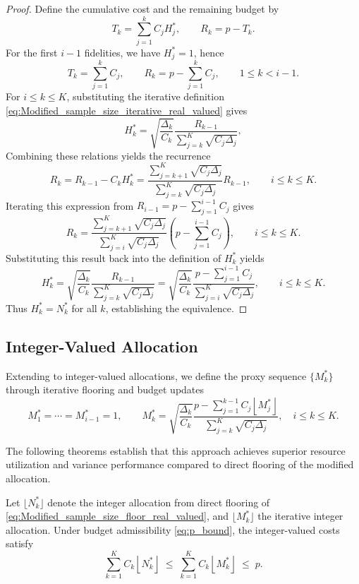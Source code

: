 \begin{proof}
Define the cumulative cost and the remaining budget by
%
\[
T_k = \sum_{j=1}^k C_j H_j^*, 
\qquad 
R_k = p - T_k.
\]
%
For the first $i-1$ fidelities, we have $H_j^* = 1$, hence
%
\[
T_k = \sum_{j=1}^k C_j, \qquad R_k = p - \sum_{j=1}^k C_j, \qquad 1 \le k < i-1.
\]
%
For $i \le k \le K$, substituting the iterative definition \eqref{eq:Modified_sample_size_iterative_real_valued} gives
%
\[
H_k^* 
= \sqrt{\frac{\Delta_k}{C_k}}
  \frac{R_{k-1}}{\sum_{j=k}^{K} \sqrt{C_j \Delta_j}},
\]
%
Combining these relations yields the recurrence
%
\[
R_k = R_{k-1} - C_k H_k^*
=
\frac{\sum_{j=k+1}^{K} \sqrt{C_j \Delta_j}}
       {\sum_{j=k}^{K} \sqrt{C_j \Delta_j}} R_{k-1},
\qquad i \le k \le K.
\]
%
Iterating this expression from $R_{i-1} = p - \sum_{j=1}^{i-1} C_j$ gives
%
\[
R_k 
= 
\frac{\sum_{j=k+1}^{K} \sqrt{C_j \Delta_j}}
       {\sum_{j=i}^{K} \sqrt{C_j \Delta_j}}
  \left( p - \sum_{j=1}^{i-1} C_j \right),
\qquad i \le k \le K.
\]
%
Substituting this result back into the definition of $H_k^*$ yields
%
\[
H_k^*
= \sqrt{\frac{\Delta_k}{C_k}}
  \frac{R_{k-1}}{\sum_{j=k}^{K} \sqrt{C_j \Delta_j}}
= \sqrt{\frac{\Delta_k}{C_k}}
  \frac{p - \sum_{j=1}^{i-1} C_j}
       {\sum_{j=i}^{K} \sqrt{C_j \Delta_j}},
\qquad i \le k \le K.
\]
%
Thus $H_k^* = N_k^*$ for all $k$, establishing the equivalence. 
\end{proof}


\subsection{Integer-Valued Allocation}
Extending to integer-valued allocations, we define the proxy sequence $\{M_k^*\}$ through iterative flooring and budget updates
%
\begin{equation}
    \label{eq:Modified_sample_size_iterative_integer_proxy}
    M_1^*=\cdots=M_{i-1}^*=1, \qquad 
    M_k^*=\sqrt{\frac{\Delta_k}{C_k}}
    \frac{p-\sum_{j=1}^{k-1} C_j\left\lfloor M_j^*\right\rfloor}
         {\sum_{j=k}^{K}\sqrt{C_j\Delta_j}}, \quad i\le k\le K.
\end{equation}
%

The following theorems establish that this approach achieves superior resource utilization and variance performance compared to direct flooring of the modified allocation.


\begin{theorem}
\label{thm:MFMC_modified_integer_cost}
Let $\lfloor N_k^* \rfloor$ denote the integer allocation from direct flooring of \eqref{eq:Modified_sample_size_floor_real_valued}, and $\lfloor M_k^* \rfloor$ the iterative integer allocation. Under budget admissibility \eqref{eq:p_bound}, the integer-valued costs satisfy
\[
\sum_{k=1}^K C_k \left\lfloor N_k^* \right\rfloor\;\le\; \sum_{k=1}^K C_k\left\lfloor M_k^* \right\rfloor \;\le\; p.
\]
\end{theorem}




